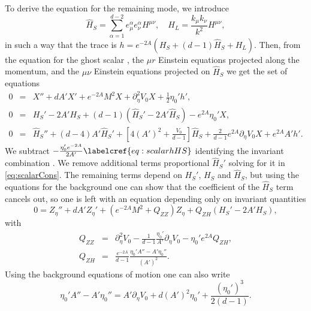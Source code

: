 To derive the equation for the remaining mode, we introduce
\begin{equation}
	\widehat H_S=\sum_{\alpha=1}^{d-2}e_\mu^\alpha e_\nu^\alpha H^{\mu\nu}, \quad H_L=\frac{k_\mu k_\nu}{k^2}H^{\mu\nu},
\end{equation}
in such a way that the trace is $h=e^{-2A}(H_S+(d-1)\widehat H_S+H_L)$.
Then, from the equation for the ghost scalar , the $\mu r$ Einstein equations projected along the momentum, and the $\mu\nu$ Einstein equations projected on $\widehat H_S$ we get the set of equations
\begin{eqnarray}
\label{eq:scalarX} 0&=& X''+dA'X'+e^{-2A}M^2 X+\partial_\eta^2 V_0 X+\frac{1}{2}\eta_0' h',\\
\label{eq:scalarCons} 0&=& H_S'-2A' H_S+(d-1)(\widehat H_S'-2A' \widehat H_S)-e^{2A}\eta_0' X,\\
\label{eq:scalarhHS} 0&=& \widehat H_S''+(d-4) A' \widehat H_S'+\left[4(A')^2+\frac{V_0}{d-1}\right]\widehat H_S+\frac{2}{d-1}e^{2A}\partial_\eta V_0 X+e^{2A}A' h'.
\end{eqnarray}
We subtract $-\frac{\eta_0'e^{-2A}}{2A'}\labelcref{eq:scalarhHS}$ identifying the invariant combination .
We remove additional terms proportional $\widehat H_S'$ solving for it in \cref{eq:scalarCons}.
The remaining terms depend on $H_S'$, $H_S$ and $\widehat H_S$, but using the equations for the background  one can show that the coefficient of the $\widehat H_S$ term cancels out, so one is left with an equation depending only on invariant quantities
\begin{equation}\label{eq:invariantZeq}
	0=Z_\eta''+dA' Z_\eta'+\left(e^{-2A}M^2+Q_{ZZ}\right)Z_\eta+Q_{ZH}(H_S'-2A' H_S),
\end{equation}
with
\begin{eqnarray}\label{eq:Qcoefs}
	Q_{ZZ}&=& \partial_\eta^2V_0-\frac{1}{d-1}\frac{\eta_0'}{A'}\partial_\eta V_0-\eta_0' e^{2A} Q_{ZH},\\
	Q_{ZH} &=& \frac{e^{-2A}}{d-1}\frac{\eta_0'A''-A'\eta_0''}{(A')^2}.
\end{eqnarray}
Using the background equations of motion  one can also write
\begin{equation}\label{eq:Qcoef2}
	\eta_0'A''-A'\eta_0''=A'\partial_\eta V_0+d(A')^2\eta_0'+\frac{(\eta_0')^3}{2(d-1)}.
\end{equation}

